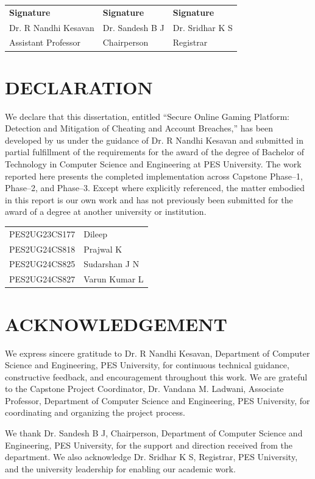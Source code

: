 \documentclass[12pt,a4paper,oneside]{report}
\begin{document}
\vspace{22mm}
\begin{tabular}{p{46mm}p{46mm}p{46mm}}
\textbf{Signature} & \textbf{Signature} & \textbf{Signature}\\
Dr. R Nandhi Kesavan & Dr. Sandesh B J & Dr. Sridhar K S\\
Assistant Professor & Chairperson & Registrar
\end{tabular}
\clearpage

\chapter*{DECLARATION}
We declare that this dissertation, entitled “Secure Online Gaming Platform: Detection and Mitigation of Cheating and Account Breaches,” has been developed by us under the guidance of Dr. R Nandhi Kesavan and submitted in partial fulfillment of the requirements for the award of the degree of Bachelor of Technology in Computer Science and Engineering at PES University. The work reported here presents the completed implementation across Capstone Phase--1, Phase--2, and Phase--3. Except where explicitly referenced, the matter embodied in this report is our own work and has not previously been submitted for the award of a degree at another university or institution.

\vspace{18mm}
\begin{tabular}{ll}
PES2UG23CS177 & Dileep\\
PES2UG24CS818 & Prajwal K\\
PES2UG24CS825 & Sudarshan J N\\
PES2UG24CS827 & Varun Kumar L
\end{tabular}
\clearpage

\chapter*{ACKNOWLEDGEMENT}
We express sincere gratitude to Dr. R Nandhi Kesavan, Department of Computer Science and Engineering, PES University, for continuous technical guidance, constructive feedback, and encouragement throughout this work. We are grateful to the Capstone Project Coordinator, Dr. Vandana M. Ladwani, Associate Professor, Department of Computer Science and Engineering, PES University, for coordinating and organizing the project process.

We thank Dr. Sandesh B J, Chairperson, Department of Computer Science and Engineering, PES University, for the support and direction received from the department. We also acknowledge Dr. Sridhar K S, Registrar, PES University, and the university leadership for enabling our academic work.
\end{document}
